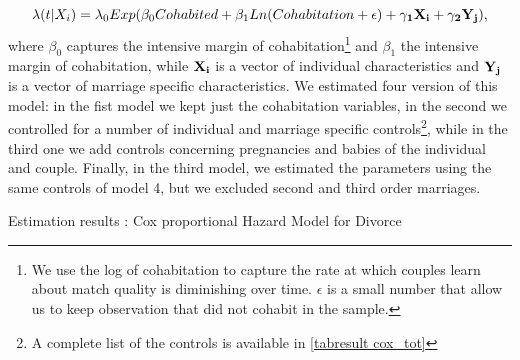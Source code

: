 \documentclass[12pt]{article}
\begin{document}
\begin{equation}\label{eq:eqcox}
\lambda(t|X_i)=\lambda_0 Exp(\beta_0 Cohabited + \beta_1 Ln(Cohabitation+\epsilon)+\bf{\gamma_1} \bf{X_i}+\bf{\gamma_2} \bf{Y_j}),
\end{equation}
where $\beta_0$ captures the intensive margin of cohabitation\footnote{We use the log of cohabitation to capture the rate at which couples learn about match quality is diminishing over time. $\epsilon$ is a small number that allow us to keep observation that did not cohabit in the sample.} and  $\beta_1$ the intensive margin of cohabitation, while  $\bf{X_i}$ is a vector of individual characteristics and   $\bf{Y_j}$ is a vector of marriage specific characteristics. We estimated four version of this model: in the fist model we kept just the cohabitation variables, in the second we controlled for a number of individual and marriage specific controls\footnote{A complete list of the controls is available in \autoref{tabresult cox_tot}}, while in the third one we add controls concerning pregnancies and babies of the individual and couple.
 Finally, in the third model, we estimated the parameters using the same controls of model 4, but we excluded second and third order marriages. 
 {	
 	\def\onepc{$^{\ast\ast}$} \def\fivepc{$^{\ast}$}
 	\def\tenpc{$^{\dag}$}
 	\def\legend{\multicolumn{3}{l}{\footnotesize{Significance levels
 				:\hspace{1em} $\ast$ : 10\% \hspace{1em}
 				$\ast\ast$ : 5\% \hspace{1em} $\ast\ast\ast$ : 1\% \normalsize}}}
 	\begin{table}[htbp]\centering
 		\caption{Estimation results : Cox proportional Hazard Model for Divorce
 			\label{tabresult cox}}
 		
 	\end{table}
 }
\end{document}
